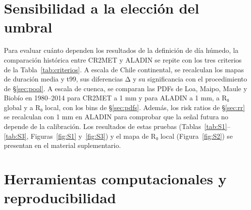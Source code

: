 \section{Sensibilidad a la elección del umbral}\label{sec:sensibilidad}

Para evaluar cuánto dependen los resultados de la definición de día húmedo, la comparación histórica entre CR2MET y ALADIN se repite con los tres criterios de la Tabla~\ref{tab:criterios}. A escala de Chile continental, se recalculan los mapas de duración media y t99, sus diferencias Δ y su significancia con el procedimiento de §\ref{sec:pool}. A escala de cuenca, se comparan las PDFs de Loa, Maipo, Maule y Biobío en 1980--2014 para CR2MET a 1 mm y para ALADIN a 1 mm, a R₀ global y a R₀ local, con los bins de §\ref{sec:pdfs}. Además, los risk ratios de §\ref{sec:rr} se recalculan con 1 mm en ALADIN para comprobar que la señal futura no depende de la calibración. Los resultados de estas pruebas (Tablas~\ref{tab:S1}--\ref{tab:S3}, Figuras~\ref{fig:S1} y~\ref{fig:S3}) y el mapa de R₀ local (Figura~\ref{fig:S2}) se presentan en el material suplementario.

\section{Herramientas computacionales y reproducibilidad}\label{sec:software}


